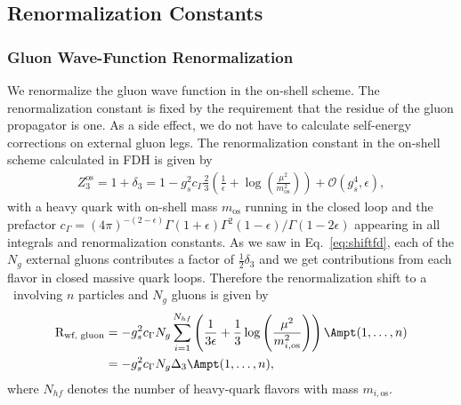 \subsection{Renormalization Constants}
\subsubsection{Gluon Wave-Function Renormalization}
We renormalize the gluon wave function in the on-shell scheme. The
renormalization constant is fixed by the requirement that the residue
of the gluon propagator is one. As a side effect, we do not have
to calculate self-energy corrections on external gluon legs. The
renormalization constant in the on-shell scheme calculated in FDH is
given by
\begin{align}
Z_3^{\text{os}}=1+\delta_{3}=1-g_s^2c_\Gamma\frac{2}{3}\left(\frac{1}{\epsilon} +
  \log\left(\frac{\mu^2}{ m_{\text{os}}^2}\right)\right)+\mathcal{O}(g_s^4,\epsilon),
\end{align}
with a heavy quark with on-shell mass $m_{\text{os}}$ running in the
closed loop and the prefactor $\displaystyle
c_\Gamma=(4\pi)^{-(2-\epsilon)}\Gamma(1+\epsilon)\Gamma^2(1-\epsilon)/\Gamma(1-2\epsilon)$
appearing in all integrals and renormalization constants. As we saw
in Eq.~\eqref{eq:shiftfd}, each of the $N_g$ external gluons contributes a
factor of $\frac{1}{2}\delta_3$ and we get contributions from each
flavor in closed massive quark loops. Therefore the
renormalization shift to a \ola~involving $n$ particles and $N_g$ gluons is given by
\begin{align}
\begin{split}
  \text{R}_{\text{wf, gluon}} &= -g_s^{2}c_\Gamma
N_g\sum_{i=1}^{N_{hf}}\left(\frac{1}{3\epsilon} + 
  \frac{1}{3}\log\left(\frac{\mu^2}{ m_{i,\text{os}}^2}\right)\right)
\Ampt(1,\dots,n)\\
&=-g_s^{2}c_\Gamma
N_g \Delta_3 \Ampt(1,\dots,n),
\end{split}
\end{align}
where $N_{hf}$ denotes the number of heavy-quark flavors with mass $m_{i,\text{os}}$.
